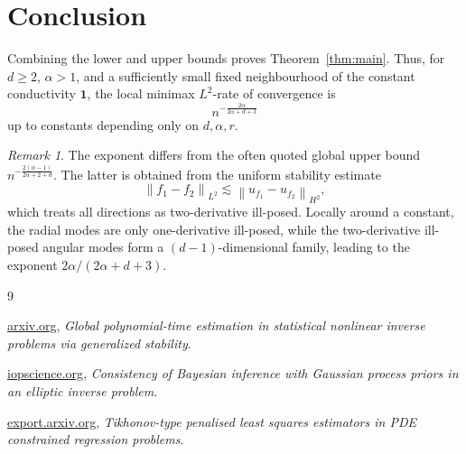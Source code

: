 \documentclass{article}
\theoremstyle{remark}
\newtheorem{remark}[theorem]{Remark}
\newcommand{\norm}[1]{\left\|#1\right\|}
\newcommand{\one}{\mathbf 1}
\begin{document}
\section{Conclusion}

Combining the lower and upper bounds proves Theorem~\ref{thm:main}. Thus, for \(d\ge 2\), \(\alpha>1\), and a sufficiently small fixed neighbourhood of the constant conductivity \(\one\), the local minimax \(L^2\)-rate of convergence is
\[
n^{-\frac{2\alpha}{2\alpha+d+3}}
\]
up to constants depending only on \(d,\alpha,r\).

\begin{remark}
The exponent differs from the often quoted global upper bound
\(n^{-\frac{2(\alpha-1)}{2\alpha+2+d}}\). The latter is obtained from the uniform stability estimate
\[
\norm{f_1-f_2}_{L^2}\lesssim \norm{u_{f_1}-u_{f_2}}_{H^2},
\]
which treats all directions as two-derivative ill-posed. Locally around a constant, the radial modes are only one-derivative ill-posed, while the two-derivative ill-posed angular modes form a \((d-1)\)-dimensional family, leading to the exponent \(2\alpha/(2\alpha+d+3)\).
\end{remark}

\begin{thebibliography}{9}

\href{https://arxiv.org/html/2601.09007}{arxiv.org},
\textit{Global polynomial-time estimation in statistical nonlinear inverse problems via generalized stability}.

\href{https://google.iopscience.iop.org/article/10.1088/1361-6420/ab7d2a}{iopscience.org},
\textit{Consistency of Bayesian inference with Gaussian process priors in an elliptic inverse problem}.

\href{https://export.arxiv.org/pdf/1809.08818v3.pdf}{export.arxiv.org},
\textit{Tikhonov-type penalised least squares estimators in PDE constrained regression problems}.

\end{thebibliography}
\end{document}
